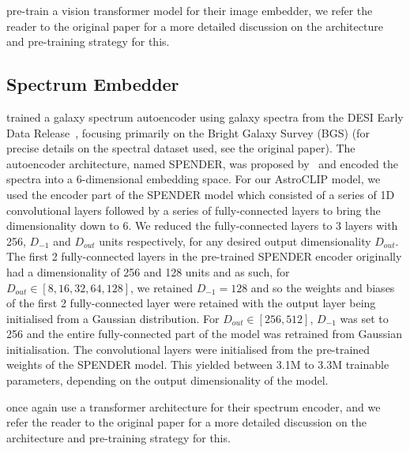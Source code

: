 \cite{astroclip} pre-train a vision transformer model for their image embedder, we refer the reader to the original paper
for a more detailed discussion on the architecture and pre-training strategy for this.

\subsection{Spectrum Embedder}\label{subsec:spectrum-embedder}
\cite{liang2023} trained a galaxy spectrum autoencoder using galaxy spectra from the DESI Early Data Release~\citep{desiearly2023},
focusing primarily on the Bright Galaxy Survey (BGS) (for precise details on the spectral dataset used, see the original paper).
The autoencoder architecture, named SPENDER, was proposed by~\cite{melchior2022} and encoded the spectra into a 6-dimensional
embedding space.
For our AstroCLIP model, we used the encoder part of the SPENDER model which consisted of a series of 1D convolutional layers
followed by a series of fully-connected layers to bring the dimensionality down to 6.
We reduced the fully-connected layers to 3 layers with 256, $D_{-1}$ and $D_{out}$ units respectively, for any desired
output dimensionality $D_{out}$.
The first 2 fully-connected layers in the pre-trained SPENDER encoder originally had a dimensionality of 256 and 128 units
and as such, for $D_{out} \in [8, 16, 32, 64, 128]$, we retained $D_{-1}=128$ and so the weights and biases of the
first 2 fully-connected layer were retained with the output layer being initialised from a Gaussian distribution.
For $D_{out} \in [256, 512]$, $D_{-1}$ was set to 256 and the entire fully-connected part of the model was retrained
from Gaussian initialisation.
The convolutional layers were initialised from the pre-trained weights of the SPENDER model.
This yielded between 3.1M to 3.3M trainable parameters, depending on the output dimensionality of the model.

\cite{astroclip} once again use a transformer architecture for their spectrum encoder, and we refer the reader to the original
paper for a more detailed discussion on the architecture and pre-training strategy for this.
